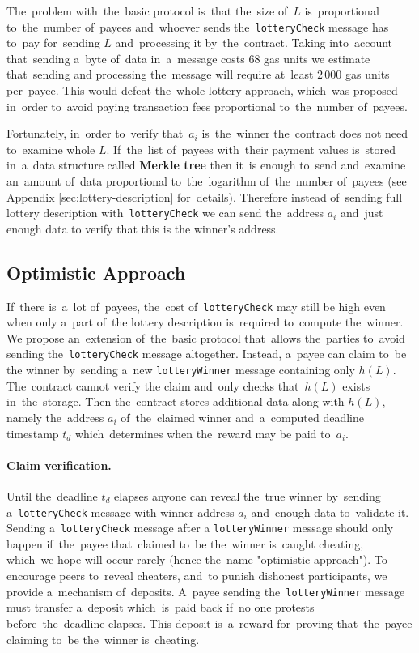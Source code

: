 \documentclass[a4paper]{article}
\newcommand{\lotteryhash}[1]{h({#1})}
\begin{document}
    The~problem with~the~basic protocol is~that the~size of~$L$ is~proportional to~the~number of~payees and~whoever
    sends the~\texttt{lotteryCheck} message has to~pay for~sending $L$ and~processing it by~the~contract.
    Taking into~account that~sending a~byte of~data in~a~message costs 68 gas units we estimate that~sending and
    processing the~message will require at~least $2\,000$ gas units per~payee. This would defeat the~whole lottery
    approach, which~was proposed in~order to~avoid paying transaction fees proportional to~the~number of~payees.

    Fortunately, in~order to~verify that~$a_i$ is~the~winner the~contract does not need to~examine whole $L$.
    If~the~list of~payees with~their payment values is~stored in~a~data structure called \textbf{Merkle tree} then it~is
    enough to~send and~examine an~amount of~data proportional to~the~logarithm of~the~number of~payees
    (see Appendix \ref{sec:lottery-description} for~details). Therefore instead of~sending
    full lottery description with~\texttt{lotteryCheck} we can send the~address $a_i$ and~just enough
    data to verify that this is the winner's address.

\subsection{Optimistic Approach}\label{sec:optimistic}
    If~there is~a~lot of~payees, the~cost of~\texttt{lotteryCheck} may still be high even when only a~part of~the
    lottery description is~required to~compute the~winner. We propose an~extension of~the~basic protocol that~allows
    the~parties to~avoid sending the~\texttt{lotteryCheck} message altogether. Instead, a~payee can claim to~be the
    winner by~sending a~new \texttt{lotteryWinner} message containing only $\lotteryhash{L}$. The~contract cannot verify the
    claim and~only checks that~$\lotteryhash{L}$ exists in~the~storage. Then the~contract stores additional data along with
    $\lotteryhash{L}$, namely the~address $a_i$ of~the~claimed winner and~a~computed deadline timestamp $t_d$ which~determines
    when the~reward may be paid to~$a_i$.

    \paragraph{Claim verification.}
    Until the~deadline $t_d$ elapses anyone can reveal the~true winner by~sending a~\texttt{lotteryCheck} message with
    winner address $a_i$ and~enough data to~validate it. Sending a~\texttt{lotteryCheck} message after a
    \texttt{lotteryWinner} message should only happen if~the~payee that~claimed to~be the~winner is~caught cheating,
    which~we hope will occur rarely (hence the~name "optimistic approach"). To encourage peers to~reveal cheaters,
    and~to punish dishonest participants, we provide a~mechanism of~deposits. A~payee sending the~\texttt{lotteryWinner}
    message must transfer a~deposit which~is~paid back if~no one protests before~the~deadline elapses.
    This deposit is~a~reward for~proving that~the~payee claiming to~be the~winner is~cheating.
\end{document}
